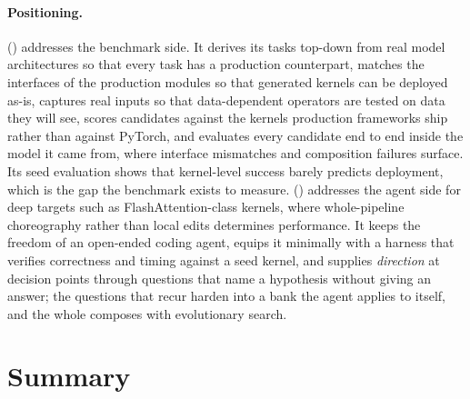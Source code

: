 \paragraph{Positioning.}
\FastKernels () addresses the benchmark side.
It derives its tasks top-down from real model architectures so that every task has a production counterpart, matches the interfaces of the production modules so that generated kernels can be deployed as-is, captures real inputs so that data-dependent operators are tested on data they will see, scores candidates against the kernels production frameworks ship rather than against PyTorch, and evaluates every candidate end to end inside the model it came from, where interface mismatches and composition failures surface.
Its seed evaluation shows that kernel-level success barely predicts deployment, which is the gap the benchmark exists to measure.
\KernelSeek () addresses the agent side for deep targets such as FlashAttention-class kernels, where whole-pipeline choreography rather than local edits determines performance.
It keeps the freedom of an open-ended coding agent, equips it minimally with a harness that verifies correctness and timing against a seed kernel, and supplies \emph{direction} at decision points through questions that name a hypothesis without giving an answer; the questions that recur harden into a bank the agent applies to itself, and the whole composes with evolutionary search.

\section{Summary}
\label{background:sec:summary}

